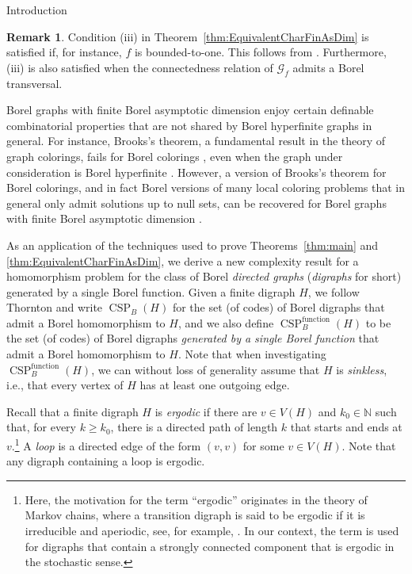 \documentclass[psamsfonts]{amsart}
\theoremstyle{definition}
\newtheorem{remark}[thm]{Remark}
\theoremstyle{remark}
\numberwithin{equation}{section}
\newcommand\mcal{\mathcal}
\begin{document}
\begin{section}{Introduction}
\begin{remark}\label{rem:Bounded}
Condition (iii) in Theorem~\ref{thm:EquivalentCharFinAsDim} is satisfied if, for instance, $f$ is bounded-to-one.
This follows from \cite[Corollary~5.3]{kst1999}.
Furthermore, (iii) is also satisfied when the connectedness relation of $\mcal{G}_f$ admits a Borel transversal.
\end{remark}

Borel graphs with finite Borel asymptotic dimension enjoy certain definable combinatorial properties that are not shared by Borel hyperfinite graphs in general.
For instance, Brooks's theorem, a fundamental result in the theory of graph colorings, fails for Borel colorings \cite{marks2016}, even when the graph under consideration is Borel hyperfinite \cite{cjmst2020}.
However, a version of Brooks's theorem for Borel colorings, and in fact Borel versions of many local coloring problems that in general only admit solutions up to null sets, can be recovered for Borel graphs with finite Borel asymptotic dimension \cite{bw2023}.




As an application of the techniques used to prove Theorems~\ref{thm:main} and \ref{thm:EquivalentCharFinAsDim}, we derive a new complexity result for a homomorphism problem for the class of Borel \emph{directed graphs} (\emph{digraphs} for short) generated by a single Borel function.
Given a finite digraph $H$, we follow Thornton \cite{thornton2022} and write $\operatorname{CSP}_B(H)$ for the set (of codes) of Borel digraphs that admit a Borel homomorphism to $H$, and we also define $\operatorname{CSP}^{\operatorname{function}}_B(H)$ to be the set (of codes) of Borel digraphs \emph{generated by a single Borel function} that admit a Borel homomorphism to $H$.
Note that when investigating $\operatorname{CSP}^{\operatorname{function}}_B(H)$, we can without loss of generality assume that $H$ is \emph{sinkless}, i.e., that every vertex of $H$ has at least one outgoing edge.

Recall that a finite digraph $H$ is \emph{ergodic} if there are $v\in V(H)$ and $k_0\in \mathbb{N}$ such that, for every $k\ge k_0$, there is a directed path of length $k$ that starts and ends at $v$.\footnote{Here, the motivation for the term ``ergodic'' originates in the theory of Markov chains, where a transition digraph is said to be ergodic if it is irreducible and aperiodic, see, for example, \cite{Norris1997}.
In our context, the term is used for digraphs that contain a strongly connected component that is ergodic in the stochastic sense.}
A \emph{loop} is a directed edge of the form $(v, v)$ for some $v \in V(H)$. Note that any digraph containing a loop is ergodic.


\end{section}
\end{document}
